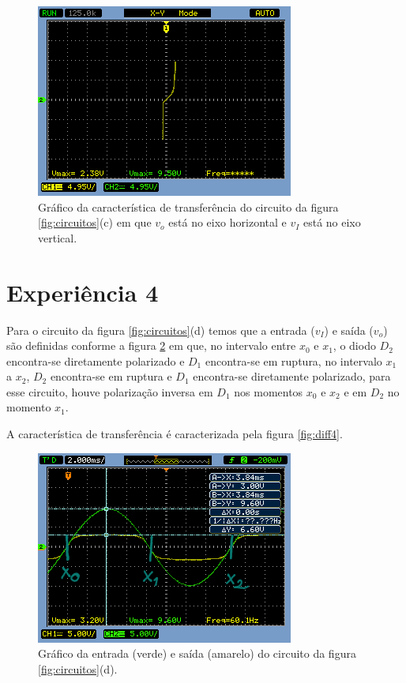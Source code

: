 \documentclass{abntex2}
\begin{document}
\begin{figure}[h]
  \centering
  \includegraphics[scale = 0.7]{diferenca-1c.png}
  \caption{Gráfico da característica de transferência do circuito da figura \ref{fig:circuitos}(c) em que $v_o$ está no eixo horizontal e $v_I$ está no eixo vertical.}
  \label{fig:diff3}
\end{figure}
\pagebreak
\section{Experiência 4}

Para o circuito da figura \ref{fig:circuitos}(d) temos que a entrada ($v_I$) e saída ($v_o$) são definidas conforme a figura \ref{fig:io4}  em que, no intervalo entre $x_0$ e $x_1$, o diodo $D_2$ encontra-se diretamente polarizado e $D_1$ encontra-se em ruptura, no intervalo $x_1$ a $x_2$, $D_2$ encontra-se em ruptura e $D_1$ encontra-se diretamente polarizado, para esse circuito, houve polarização inversa em $D_1$ nos momentos $x_0$ e $x_2$ e em $D_2$ no momento $x_1$.

A característica de transferência é caracterizada pela figura \ref{fig:diff4}.

\begin{figure}[h]
  \centering
  \includegraphics[scale = 0.6]{circuito-1d-esboco2.png}
  \caption{Gráfico da entrada (verde) e saída (amarelo) do circuito da figura \ref{fig:circuitos}(d).}
  \label{fig:io4}
\end{figure}
\end{document}
